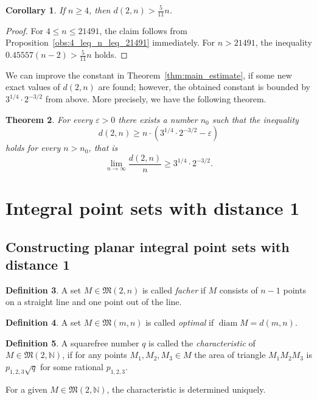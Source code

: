 \documentclass[a4paper,14pt]{article} %
\theoremstyle{plain}
\newtheorem{theorem}{Theorem}[section]
\newtheorem{corollary}[theorem]{Corollary}
\theoremstyle{definition}
\newtheorem{definition}[theorem]{Definition}
\begin{document}
\begin{corollary}
	If $n\geq 4$, then $d(2,n) > \frac{5}{11} n$.
\end{corollary}

\begin{proof}
	For $4 \leq n \leq 21491$, the claim follows from Proposition~\ref{obs:4_leq_n_leq_21491} immediately.
	For $n > 21491$, the inequality $0.45557(n-2) > \frac{5}{11}n$ holds.
\end{proof}


We can improve the constant in Theorem~\ref{thm:main_estimate},
if some new exact values of $d(2,n)$ are found;
however, the obtained constant is bounded by $3^{1/4}\cdot2^{-3/2}$ from above.
More precisely, we have the following theorem.

\begin{theorem}
	For every $\varepsilon > 0$ there exists a number $n_0$ such that the inequality
	\begin{equation}
		d(2,n) \geq n\cdot(3^{1/4}\cdot 2^{-3/2} - \varepsilon)
	\end{equation}
	holds for every $n>n_0$,
	that is
	\begin{equation}
		\lim_{n\to\infty} \frac{d(2,n)}{n} \geq 3^{1/4}\cdot 2^{-3/2}
		.
	\end{equation}
\end{theorem}



\section{Integral point sets with distance 1}

\subsection{Constructing planar integral point sets with distance 1}

\begin{definition}
	A set $M\in\mathfrak{M}(2,n)$ is called \textit{facher}
	if $M$ consists of $n-1$ points on a straight line
	and one point out of the line.
\end{definition}

\begin{definition}
	A set $M\in\mathfrak{M}(m,n)$ is called \textit{optimal}
	if $\operatorname{diam}M=d(m,n)$.
\end{definition}

\begin{definition}
	\cite{kurz2005characteristic}
	A squarefree number $q$ is called the \textit{characteristic} of $M\in\mathfrak{M}(2,\mathbb{N})$,
	if for any points $M_1, M_2, M_3 \in M$ the area of triangle $M_1 M_2 M_3$
	is $p_{1,2,3}\sqrt{q}$ for some rational $p_{1,2,3}$.
\end{definition}
For a given $M\in\mathfrak{M}(2,\mathbb{N})$, the characteristic is determined uniquely.
\end{document}
